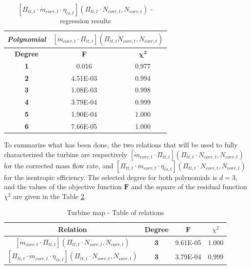 \begin{longtable}[c]{ccc}
\caption{$[\Pi_{tt,t}\cdot \dot{m}_{corr,t}\cdot\eta_{is,t}](\Pi_{tt,t}\cdot N_{corr,t},N_{corr,t})$ - regression results }
\label{tab:C7_regturb5}\\
\hline
\multicolumn{1}{l}{\textit{\textbf{Polynomial}}} & \multicolumn{2}{c}{$[\dot{m}_{corr,t}\cdot \Pi_{tt,t}](\Pi_{tt,t}\dot N_{corr,t},N_{corr,t})$} \\ \hline
\endfirsthead
%
\endhead
%
\hline
\endfoot
%
\endlastfoot
%
\textbf{Degree}                                  & \multicolumn{1}{c}{\textbf{F}}      & \multicolumn{1}{c}{$\mathbf{\chi^2}$}      \\
\textbf{1}                                       & 0.016                               & 0.977                                      \\
\textbf{2}                                       & 4.51E-03                            & 0.994                                      \\
\textbf{3}                                       & 1.08E-03                            & 0.998                                      \\
\textbf{4}                                       & 3.79E-04                            & 0.999                                      \\
\textbf{5}                                       & 1.90E-04                            & 1.000                                      \\
\textbf{6}                                       & 7.66E-05                            & 1.000                                      \\ \hline
\end{longtable}

To summarize what has been done, the two relations that will be used to fully characterized the turbine are respectively $[\dot{m}_{corr,t}\cdot \Pi_{tt,t}](\Pi_{tt,t}\cdot N_{corr,t},N_{corr,t})$ for the corrected mass flow rate, and $[\Pi_{tt,t}\cdot \dot{m}_{corr,t}\cdot\eta_{is,t}](\Pi_{tt,t}\cdot N_{corr,t},N_{corr,t})$ for the isentropic efficiency. The selected degree for both polynomials is $d=3$, and the values of the objective function $\mathbf{F}$ and the square of the residual function $\chi^2$ are given in the Table \ref{tab:C7_turbmaprel}.

\begin{longtable}[c]{@{}cccc@{}}
\caption{Turbine map - Table of relations}
\label{tab:C7_turbmaprel}\\
\toprule
\multicolumn{1}{c}{\textbf{Relation}} & \multicolumn{1}{c}{\textbf{Degree}} & \multicolumn{1}{c}{$\mathbf{F}$} & \multicolumn{1}{c}{$\chi^2$} \\* \midrule
\endfirsthead
%
\endhead
%
\bottomrule
\endfoot
%
\endlastfoot
%
$[\dot{m}_{corr,t}\cdot \Pi_{tt,t}](\Pi_{tt,t}\cdot N_{corr,t},N_{corr,t})$           & \textbf{3}   & 9.61E-05                   & 1.000 \\
$[\Pi_{tt,t}\cdot \dot{m}_{corr,t}\cdot\eta_{is,t}](\Pi_{tt,t}\cdot N_{corr,t},N_{corr,t})$           & \textbf{3}   & 3.79E-04                    & 0.999        \\* \bottomrule
\end{longtable}

